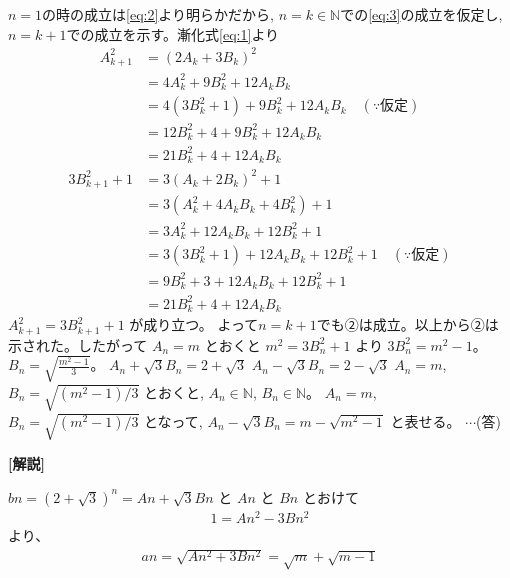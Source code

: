 \documentclass[a4paper,10pt]{ltjsarticle}
\begin{document}
\begin{multicols}{2}
$n=1$の時の成立は\cref{eq:2}より明らかだから, $n=k \in \mathbb{N}$での\cref{eq:3}の成立を仮定し, $n=k+1$での成立を示す。漸化式\cref{eq:1}より
\begin{align*} 
  A_{k+1}^2 
  &= (2A_k + 3B_k)^2 \\ 
  &= 4A_k^2 + 9B_k^2 + 12A_kB_k \\ 
  &= 4(3B_k^2 + 1) + 9B_k^2 + 12A_kB_k \quad (\text{∵仮定}) \\ 
  &= 12B_k^2 + 4 + 9B_k^2 + 12A_kB_k \\ 
  &= 21B_k^2 + 4 + 12A_kB_k 
\end{align*}
\begin{align*} 
  3B_{k+1}^2 + 1 
  &= 3(A_k + 2B_k)^2 + 1 \\ 
  &= 3(A_k^2 + 4A_kB_k + 4B_k^2) + 1 \\ 
  &= 3A_k^2 + 12A_kB_k + 12B_k^2 + 1 \\ 
  &= 3(3B_k^2 + 1) + 12A_kB_k + 12B_k^2 + 1 \quad (\text{∵仮定}) \\ 
  &= 9B_k^2 + 3 + 12A_kB_k + 12B_k^2 + 1 \\ 
  &= 21B_k^2 + 4 + 12A_kB_k 
\end{align*}
$A_{k+1}^2 = 3B_{k+1}^2 + 1$ が成り立つ。
よって$n=k+1$でも②は成立。以上から②は示された。したがって
$A_n = m$ とおくと $m^2 = 3B_n^2 + 1$ より $3B_n^2 = m^2-1$。
$B_n = \sqrt{\frac{m^2-1}{3}}$。
$A_n + \sqrt{3}B_n = 2+\sqrt{3}$
$A_n - \sqrt{3}B_n = 2-\sqrt{3}$
$A_n = m$, $B_n = \sqrt{(m^2-1)/3}$ とおくと, $A_n \in \mathbb{N}$, $B_n \in \mathbb{N}$。
$A_n = m$, $B_n = \sqrt{(m^2-1)/3}$ となって, $A_n - \sqrt{3}B_n = m - \sqrt{m^2-1}$ と表せる。
$\cdots$(答)

\vspace{10pt}
{\bf[解説]}

$bn=(2+\sqrt{3})^n = An + \sqrt{3}Bn$ と $An$ と $Bn$ とおけて 
\begin{align}
1 = An^2 - 3Bn^2
\end{align}
より、
\begin{align}
an = \sqrt{An^2 + 3Bn^2} = \sqrt{m} + \sqrt{m-1}  
\end{align}


\newpage
\end{multicols}
\end{document}
